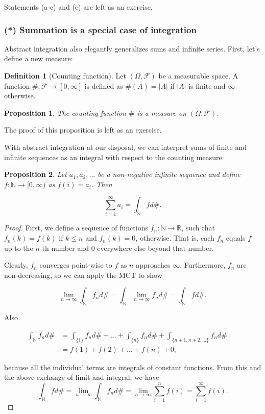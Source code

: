 \documentclass{book}
\theoremstyle{plain}%
\newtheorem{proposition}{Proposition}[section]
\theoremstyle{definition}
\newtheorem{definition}{Definition}[section]
\newlength{\arrow}
\begin{document}
Statements (a-c) and (e) are left as an exercise.


\subsubsection*{(*) Summation is a special case of integration}

Abstract integration also elegantly generalizes sums and infinite series. First, let's define a new measure:

\begin{definition}[Counting function] Let $(\Omega, \mathcal{F})$ be a measurable space. A function $\#:\mathcal{F} \longrightarrow [0,\infty]$ is defined as $\#(A) = |A|$ if $|A|$ is finite and $\infty$ otherwise.
\end{definition}

\begin{proposition}
The counting function $\#$ is a measure on $(\Omega, \mathcal{F})$.\label{prop:counting}
\end{proposition}

The proof of this proposition is left as an exercise.

With abstract integration at our disposal, we can interpret sums of finite and infinite sequences as an integral with respect to the counting measure:

\begin{proposition} Let $a_1, a_2, ...$ be a non-negative infinite sequence and define $f: \mathbb{N} \longrightarrow [0, \infty)$ as $f(i) = a_i$. Then

$$\sum_{i=1}^\infty a_i = \int_\mathbb{N} f d\#.$$
\end{proposition}

\begin{proof} First, we define a sequence of functions $f_n: \mathbb{N} \longrightarrow \mathbb{R}$, such that $f_n(k) = f(k)$ if $k \leq n$ and $f_n(k) = 0$, otherwise. That is, each $f_n$ equals $f$ up to the $n$-th number and 0 everywhere else beyond that number.

Clearly, $f_n$ converges point-wise to $f$ as $n$ approaches $\infty$. Furthermore, $f_n$ are non-decreasing, so we can apply the MCT to show

$$\lim_{n \rightarrow \infty} \int_\mathbb{N} f_n d\# = \int_\mathbb{N} \lim_{n \rightarrow \infty} f_n d\# = \int_\mathbb{N} f d\#.$$

Also

\begin{align*}
    \int_\mathbb{N} f_n d\# &= \int_{\{1\}} f_n d\# + \dots + \int_{\{n\}} f_n d\# + \int_{\{n+1, n+2, \dots\}} f_n d\# && \text{}\\
    &= f(1) + f(2) + \dots + f(n) + 0, &&
\end{align*}

because all the individual terms are integrals of constant functions. From this and the above exchange of limit and integral, we have $$\int_\mathbb{N} f d\# =\lim_{n \rightarrow \infty} \int_\mathbb{N} f_n d\# = \lim_{n \rightarrow \infty} \sum_{i=1}^n f(i) = \sum_{i=1}^\infty f(i).$$

\end{proof}
\end{document}
